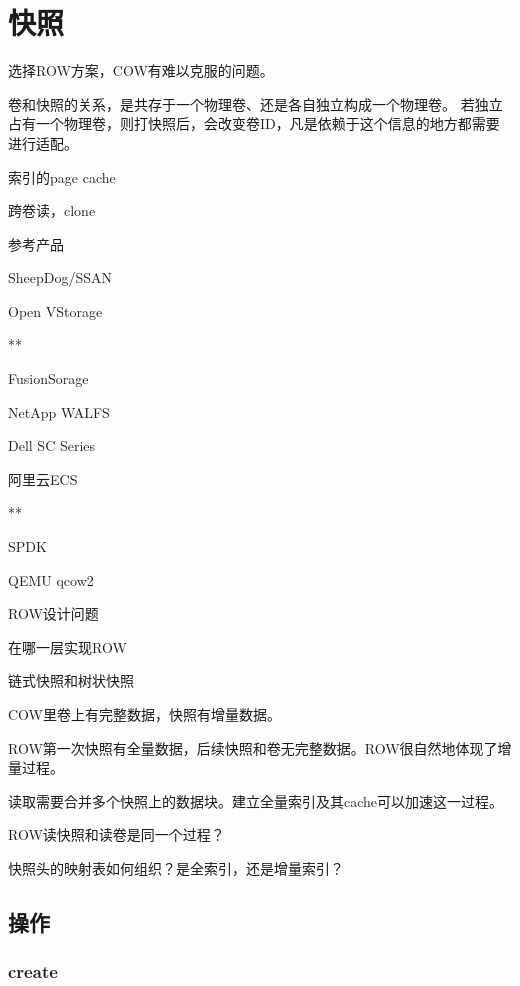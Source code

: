 \chapter{快照}

选择ROW方案，COW有难以克服的问题。

卷和快照的关系，是共存于一个物理卷、还是各自独立构成一个物理卷。
若独立占有一个物理卷，则打快照后，会改变卷ID，凡是依赖于这个信息的地方都需要进行适配。

索引的page cache

跨卷读，clone

参考产品
\begin{enumbox}
\item SheepDog/SSAN
\item Open VStorage
\item ***
\item FusionSorage
\item NetApp WALFS
\item Dell SC Series
\item 阿里云ECS
\item ***
\item SPDK
\item QEMU qcow2
\end{enumbox}

ROW设计问题
\begin{enumbox}
\item 在哪一层实现ROW
\item 链式快照和树状快照
\item COW里卷上有完整数据，快照有增量数据。
\item ROW第一次快照有全量数据，后续快照和卷无完整数据。ROW很自然地体现了增量过程。
\item 读取需要合并多个快照上的数据块。建立全量索引及其cache可以加速这一过程。
\item ROW读快照和读卷是同一个过程？
\item 快照头的映射表如何组织？是全索引，还是增量索引？
\end{enumbox}

\section{操作}

\subsection{create}


